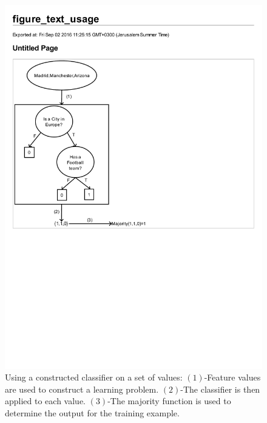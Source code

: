 \documentclass[twoside,11pt]{article}
\theoremstyle{definition}
\begin{document}
\begin{figure}[t]
	\centering
	\includegraphics[scale=0.8]{fig6.pdf}
	\caption{Using a constructed classifier on a set of values: $(1)$-Feature values are used to construct a learning problem. $(2)$-The classifier is then applied to each value. $(3)$-The majority function is used to determine the output for the training example.}
	\label{figure5}
\end{figure}

\end{document}
